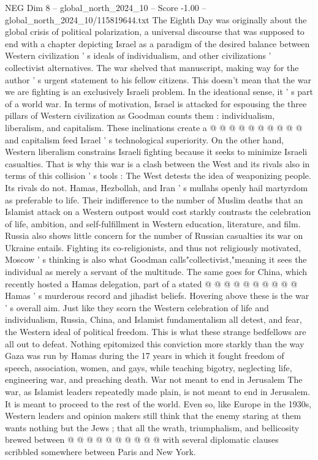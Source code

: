 \begin{textsample}{NEG Dim 8 – global\_north\_2024\_10 – Score -1.00 – global\_north\_2024\_10/115819644.txt}
The Eighth Day was originally about the global crisis of political polarization, a universal discourse that was supposed to end with a chapter depicting Israel as a paradigm of the desired balance between Western civilization ' s ideals of individualism, and other civilizations ' collectivist alternatives.
The war shelved that manuscript, making way for the author ' s urgent statement to his fellow citizens.
This doesn't mean that the war we are fighting is an exclusively Israeli problem.
In the ideational sense, it ' s part of a world war.
In terms of motivation, Israel is attacked for espousing the three pillars of Western civilization as Goodman counts them : individualism, liberalism, and capitalism.
These inclinations create a @ @ @ @ @ @ @ @ @ @ and capitalism feed Israel ' s technological superiority.
On the other hand, Western liberalism constrains Israeli fighting because it seeks to minimize Israeli casualties.
That is why this war is a clash between the West and its rivals also in terms of this collision ' s tools : The West detests the idea of weaponizing people.
Its rivals do not.
Hamas, Hezbollah, and Iran ' s mullahs openly hail martyrdom as preferable to life.
Their indifference to the number of Muslim deaths that an Islamist attack on a Western outpost would cost starkly contrasts the celebration of life, ambition, and self-fulfillment in Western education, literature, and film.
Russia also shows little concern for the number of Russian casualties its war on Ukraine entails.
Fighting its co-religionists, and thus not religiously motivated, Moscow ' s thinking is also what Goodman calls"collectivist,"meaning it sees the individual as merely a servant of the multitude.
The same goes for China, which recently hosted a Hamas delegation, part of a stated @ @ @ @ @ @ @ @ @ @ Hamas ' s murderous record and jihadist beliefs.
Hovering above these is the war ' s overall aim.
Just like they scorn the Western celebration of life and individualism, Russia, China, and Islamist fundamentalism all detest, and fear, the Western ideal of political freedom.
This is what these strange bedfellows are all out to defeat.
Nothing epitomized this conviction more starkly than the way Gaza was run by Hamas during the 17 years in which it fought freedom of speech, association, women, and gays, while teaching bigotry, neglecting life, engineering war, and preaching death.
War not meant to end in Jerusalem The war, as Islamist leaders repeatedly made plain, is not meant to end in Jerusalem.
It is meant to proceed to the rest of the world.
Even so, like Europe in the 1930s, Western leaders and opinion makers still think that the enemy staring at them wants nothing but the Jews ; that all the wrath, triumphalism, and bellicosity brewed between @ @ @ @ @ @ @ @ @ @ with several diplomatic clauses scribbled somewhere between Paris and New York.

\end{textsample}
